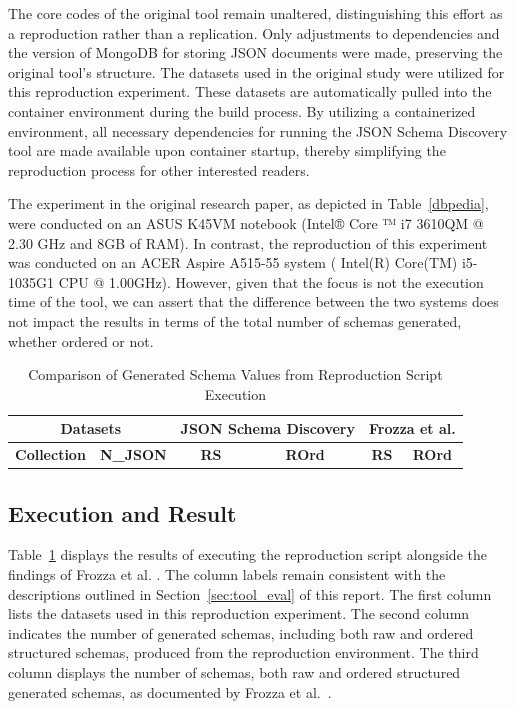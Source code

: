 \documentclass[sigconf, nonacm]{acmart}
\begin{document}
The core codes of the original tool remain unaltered, distinguishing this effort as a reproduction rather than a replication. Only adjustments to dependencies and the version of MongoDB for storing JSON documents were made, preserving the original tool's structure. The datasets used in the original study were utilized for this reproduction experiment. These datasets are automatically pulled into the container environment during the build process. By utilizing a containerized environment, all necessary dependencies for running the JSON Schema Discovery tool are made available upon container startup, thereby simplifying the reproduction process for other interested readers.

The experiment in the original research paper, as depicted in Table~\ref{dbpedia}, were conducted on an ASUS K45VM notebook (Intel® Core ™ i7 3610QM @ 2.30 GHz and 8GB of RAM)\cite{frozza2018approach}. In contrast, the reproduction of this experiment was conducted on an ACER Aspire A515-55 system ( Intel(R) Core(TM) i5-1035G1 CPU @ 1.00GHz). However, given that the focus is not the execution time of the tool, we can assert that the difference between the two systems does not impact the results in terms of the total number of schemas generated, whether ordered or not.

\begin{table}
\centering
\caption{Comparison of Generated Schema Values from Reproduction Script Execution} \label{reprod_latex}
\scalebox{0.80} {
\begin{tabular}{|l|c|c|c|c|c|}
\hline
\multicolumn{2}{|c|}{\textbf{Datasets}} & \multicolumn{2}{c|}{\textbf{JSON Schema Discovery}} &
\multicolumn{2}{c|}{\textbf{Frozza et al. \cite{frozza2018approach}}} \\
\hline
\textbf{Collection} & \textbf{N\_JSON} & \textbf{RS} & \textbf{ROrd} & \textbf{RS} & \textbf{ROrd} \\
\hline

\end{tabular}
}
\end{table}

\subsection{Execution and Result}
Table~\ref{reprod_latex} displays the results of executing the reproduction script alongside the findings of Frozza et al. \cite{frozza2018approach}. The column labels remain consistent with the descriptions outlined in Section~\ref{sec:tool_eval} of this report. 
The first column lists the datasets used in this reproduction experiment. The second column indicates the number of generated schemas, including both raw and ordered structured schemas, produced from the reproduction environment. The third column displays the number of schemas, both raw and ordered structured generated schemas, as documented by Frozza et al.~\cite{frozza2018approach}.
\end{document}
